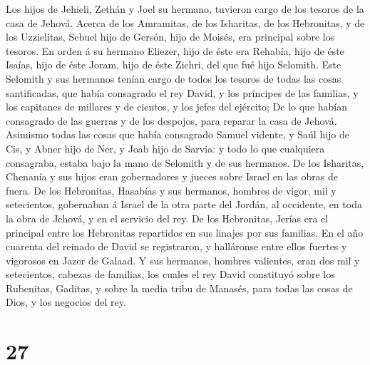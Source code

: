  Los hijos de Jehieli, Zethán y Joel su hermano, tuvieron
cargo de los tesoros de la casa de Jehová.  Acerca de los
Amramitas, de los Isharitas, de los Hebronitas, y de los Uzzielitas,
 Sebuel hijo de Gersón, hijo de Moisés, era principal
sobre los tesoros.  En orden á su hermano Eliezer, hijo
de éste era Rehabía, hijo de éste Isaías, hijo de éste Joram, hijo de
éste Zichri, del que fué hijo Selomith.  Este Selomith y
sus hermanos tenían cargo de todos los tesoros de todas las cosas
santificadas, que había consagrado el rey David, y los príncipes de las
familias, y los capitanes de millares y de cientos, y los jefes del
ejército;  De lo que habían consagrado de las guerras y
de los despojos, para reparar la casa de Jehová. 
Asimismo todas las cosas que había consagrado Samuel vidente, y Saúl
hijo de Cis, y Abner hijo de Ner, y Joab hijo de Sarvia: y todo lo que
cualquiera consagraba, estaba bajo la mano de Selomith y de sus
hermanos.  De los Isharitas, Chenanía y sus hijos eran
gobernadores y jueces sobre Israel en las obras de fuera.
 De los Hebronitas, Hasabías y sus hermanos, hombres de
vigor, mil y setecientos, gobernaban á Israel de la otra parte del
Jordán, al occidente, en toda la obra de Jehová, y en el servicio del
rey.  De los Hebronitas, Jerías era el principal entre
los Hebronitas repartidos en sus linajes por sus familias. En el año
cuarenta del reinado de David se registraron, y halláronse entre ellos
fuertes y vigorosos en Jazer de Galaad.  Y sus hermanos,
hombres valientes, eran dos mil y setecientos, cabezas de familias, los
cuales el rey David constituyó sobre los Rubenitas, Gaditas, y sobre la
media tribu de Manasés, para todas las cosas de Dios, y los negocios del
rey.

\hypertarget{section-26}{%
\section{27}\label{section-26}}

